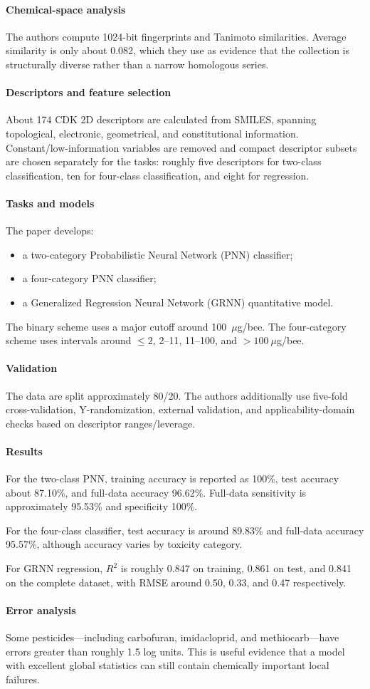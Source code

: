 \documentclass[11pt]{article}
\newcommand{\reviewfield}[2]{\paragraph{#1}#2}
\begin{document}
\reviewfield{Chemical-space analysis}{
The authors compute 1024-bit fingerprints and Tanimoto similarities. Average similarity is only about 0.082, which they use as evidence that the collection is structurally diverse rather than a narrow homologous series.
}

\reviewfield{Descriptors and feature selection}{
About 174 CDK 2D descriptors are calculated from SMILES, spanning topological, electronic, geometrical, and constitutional information. Constant/low-information variables are removed and compact descriptor subsets are chosen separately for the tasks: roughly five descriptors for two-class classification, ten for four-class classification, and eight for regression.
}

\reviewfield{Tasks and models}{
The paper develops:
\begin{itemize}
    \item a two-category Probabilistic Neural Network (PNN) classifier;
    \item a four-category PNN classifier;
    \item a Generalized Regression Neural Network (GRNN) quantitative model.
\end{itemize}
The binary scheme uses a major cutoff around 100~$\mu$g/bee. The four-category scheme uses intervals around $\leq2$, 2--11, 11--100, and $>100~\mu$g/bee.
}

\reviewfield{Validation}{
The data are split approximately 80/20. The authors additionally use five-fold cross-validation, Y-randomization, external validation, and applicability-domain checks based on descriptor ranges/leverage.
}

\reviewfield{Results}{
For the two-class PNN, training accuracy is reported as 100\%, test accuracy about 87.10\%, and full-data accuracy 96.62\%. Full-data sensitivity is approximately 95.53\% and specificity 100\%.

For the four-class classifier, test accuracy is around 89.83\% and full-data accuracy 95.57\%, although accuracy varies by toxicity category.

For GRNN regression, $R^2$ is roughly 0.847 on training, 0.861 on test, and 0.841 on the complete dataset, with RMSE around 0.50, 0.33, and 0.47 respectively.
}

\reviewfield{Error analysis}{
Some pesticides---including carbofuran, imidacloprid, and methiocarb---have errors greater than roughly 1.5 log units. This is useful evidence that a model with excellent global statistics can still contain chemically important local failures.
}
\end{document}
